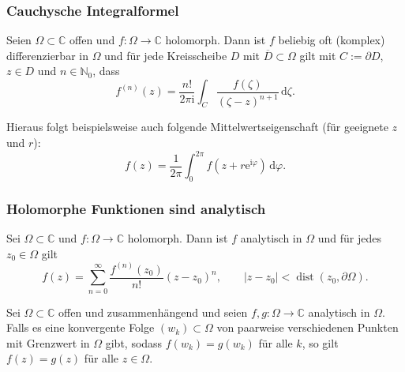 \documentclass[10pt]{beamer}
\newcommand{\iu}{\mathrm{i}}
\begin{document}
\begin{frame}
	\frametitle{Cauchysche Integralformel}
	\pause
	\begin{theorem}
		Seien $\Omega \subset \mathbb{C}$ offen und $f \colon \Omega \to \mathbb{C}$ holomorph.
		Dann ist $f$ beliebig oft (komplex) differenzierbar in $\Omega$ und für jede Kreisscheibe $D$ mit $\overline{D} \subset \Omega$ gilt mit $C := \partial D$, $z \in D$ und $n \in \mathbb{N}_0$, dass
		\[
			f^{(n)}(z) = \frac{n!}{2 \pi \iu} \int_{C} \frac{f(\zeta)}{(\zeta - z)^{n + 1}} \,\mathrm{d}\zeta.
		\]
	\end{theorem}
	\pause
	Hieraus folgt beispielsweise auch folgende Mittelwertseigenschaft (für geeignete $z$ und $r$):
	\[
		f(z) = \frac{1}{2 \pi} \int_{0}^{2 \pi} f(z + r \mathrm{e}^{\iu \varphi}) \,\mathrm{d}\varphi.
	\]
\end{frame}
\begin{frame}
	\frametitle{Holomorphe Funktionen sind analytisch}
	\pause
	\begin{theorem}
		Sei $\Omega \subset \mathbb{C}$ und $f \colon \Omega \to \mathbb{C}$ holomorph.
		Dann ist $f$ analytisch in $\Omega$ und für jedes $z_0 \in \Omega$ gilt
		\[
			f(z) = \sum_{n = 0}^{\infty} \frac{f^{(n)}(z_0)}{n!}(z - z_0)^n, \qquad \lvert z - z_0 \rvert < \operatorname{dist}(z_0, \partial \Omega).
		\]
	\end{theorem}
	\pause
	\begin{theorem}[Identitätssatz]
		Sei $\Omega \subset \mathbb{C}$ offen und zusammenhängend und seien $f, g \colon \Omega \to \mathbb{C}$ analytisch in $\Omega$.
		Falls es eine konvergente Folge $(w_k) \subset \Omega$ von paarweise verschiedenen Punkten mit Grenzwert in $\Omega$ gibt, sodass $f(w_k) = g(w_k)$ für alle $k$, so gilt $f(z) = g(z)$ für alle $z \in \Omega$.
	\end{theorem}
\end{frame}
\end{document}
